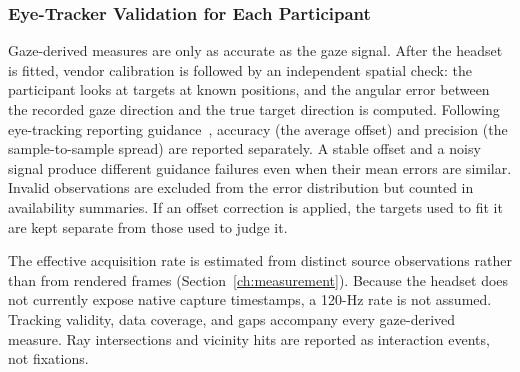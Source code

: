 \subsubsection{Eye-Tracker Validation for Each Participant}
Gaze-derived measures are only as accurate as the gaze signal. After the headset is fitted, vendor calibration is followed by an independent spatial check: the participant looks at targets at known positions, and the angular error between the recorded gaze direction and the true target direction is computed. Following eye-tracking reporting guidance~\cite{dunn2024reporting,niehorster2026dataquality}, accuracy (the average offset) and precision (the sample-to-sample spread) are reported separately. A stable offset and a noisy signal produce different guidance failures even when their mean errors are similar. Invalid observations are excluded from the error distribution but counted in availability summaries. If an offset correction is applied, the targets used to fit it are kept separate from those used to judge it.

The effective acquisition rate is estimated from distinct source observations rather than from rendered frames (Section~\ref{ch:measurement}). Because the headset does not currently expose native capture timestamps, a 120-Hz rate is not assumed. Tracking validity, data coverage, and gaps accompany every gaze-derived measure. Ray intersections and vicinity hits are reported as interaction events, not fixations.

